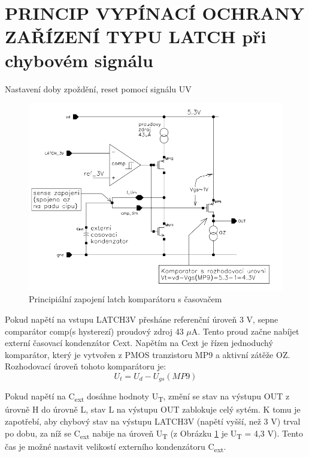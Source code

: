\section{PRINCIP VYPÍNACÍ OCHRANY ZAŘÍZENÍ TYPU LATCH při chybovém signálu}
Nastavení doby zpoždění, reset pomocí signálu UV

\begin{figure}[h]
   \begin{center}
     \includegraphics[scale=0.5]{images/Latch.png}
   \end{center}
   \caption{Principiální zapojení latch komparátoru s časovačem}
   \label{Latch}
\end{figure}

Pokud napětí na vstupu LATCH3V přesháne referenční úroveň 3 V, sepne comparátor comp(s hysterezí) proudový zdroj 43 $\mu$A. Tento proud začne nabíjet externí časovací kondenzátor Cext. Napětím na Cext je řízen jednoduchý komparátor, který je vytvořen z PMOS tranzistoru MP9 a aktivní zátěže OZ. Rozhodovací úroveň tohoto komparátoru je:
\begin{equation}
U_{t} = U_{d}-U_{gs}(MP9)
\end{equation}

Pokud napětí na C\textsubscript{ext} dosáhne hodnoty U\textsubscript{T}, změní se stav na výstupu OUT z úrovně H do úrovně L, stav L na výstupu OUT zablokuje celý sytém. K tomu je zapotřebí, aby chybový stav na výstupu LATCH3V (napětí vyšší, než 3 V) trval po dobu, za níž se C\textsubscript{ext} nabije na úroveň U\textsubscript{T} (z Obrázku \ref{Latch} je U\textsubscript{T} = 4,3 V). Tento čas je možné nastavit velikostí externího kondenzátoru C\textsubscript{ext}.

